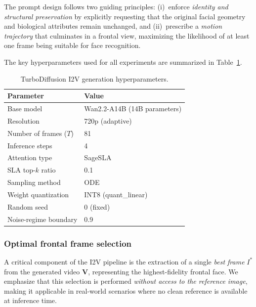 The prompt design follows two guiding principles: (i)~enforce
\emph{identity and structural preservation} by explicitly requesting
that the original facial geometry and biological attributes remain
unchanged, and (ii)~prescribe a \emph{motion trajectory} that
culminates in a frontal view, maximizing the likelihood of at least
one frame being suitable for face recognition.

The key hyperparameters used for all experiments are summarized in
Table~\ref{tab:i2v_params}.

\begin{table}[h]
\centering
\caption{TurboDiffusion I2V generation hyperparameters.}
\label{tab:i2v_params}
\begin{tabular}{l l}
\toprule
\textbf{Parameter} & \textbf{Value} \\
\midrule
Base model               & Wan2.2-A14B (14B parameters) \\
Resolution               & 720p (adaptive) \\
Number of frames ($T$)   & 81 \\
Inference steps           & 4 \\
Attention type            & SageSLA \\
SLA top-$k$ ratio         & 0.1 \\
Sampling method           & ODE \\
Weight quantization       & INT8 (quant\_linear) \\
Random seed               & 0 (fixed) \\
Noise-regime boundary     & 0.9 \\
\bottomrule
\end{tabular}
\end{table}

\subsubsection{Optimal frontal frame selection}
\label{subsubsec:frame_selection}

A critical component of the I2V pipeline is the extraction of
a single \emph{best frame} $I^{*}$ from the generated video
$\mathbf{V}$, representing the highest-fidelity frontal face.
We emphasize that this selection is performed \emph{without
access to the reference image}, making it applicable in real-world
scenarios where no clean reference is available at inference time.

